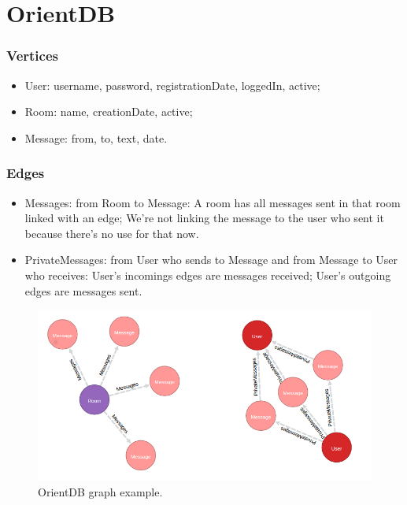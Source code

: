 \section{OrientDB} 
\label{app:orientdb}


\subsubsection{Vertices}
\begin{itemize}
\item User: username, password, registrationDate, loggedIn, active;\\
\item Room: name, creationDate, active;\\
\item Message: from, to, text, date.
\end{itemize}


\subsubsection{Edges}
\begin{itemize}
\item Messages: from Room to Message: A room has all messages sent in that room linked with an edge; We're not linking the message to the user who sent it because there's no use for that now.\\
\item PrivateMessages: from User who sends to Message and from Message to User who receives: User's incomings edges are messages received; User's outgoing edges are messages sent.\\
\end{itemize}


\begin{figure}
\centering
\includegraphics[width=\textwidth]{img/odb_graph.png}
\caption{OrientDB graph example.}
\label{fig:odbgraph}
\end{figure}
